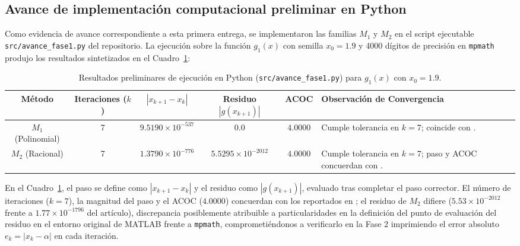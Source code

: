 \documentclass[10pt, a4paper]{article}
\begin{document}
\subsection{Avance de implementación computacional preliminar en Python}
Como evidencia de avance correspondiente a esta primera entrega, se implementaron las familias $M_1$ y $M_2$ en el script ejecutable \texttt{src/avance\_fase1.py} del repositorio. La ejecución sobre la función $g_1(x)$ con semilla $x_0 = 1.9$ y 4000 dígitos de precisión en \texttt{mpmath} produjo los resultados sintetizados en el Cuadro~\ref{tab:avance}:

\begin{table}[htbp]
    \centering
    \small
    \caption{Resultados preliminares de ejecución en Python (\texttt{src/avance\_fase1.py}) para $g_1(x)$ con $x_0 = 1.9$.}
    \label{tab:avance}
    \begin{tabularx}{\textwidth}{c c c c c X}
        \toprule
        \textbf{Método} & \textbf{Iteraciones ($k$)} & \textbf{$|x_{k+1}-x_k|$} & \textbf{Residuo $|g(x_{k+1})|$} & \textbf{ACOC} & \textbf{Observación de Convergencia} \\
        \midrule
        $M_1$ (Polinomial) & 7 & $9.5190 \times 10^{-537}$ & $0.0$ & $4.0000$ & Cumple tolerancia en $k=7$; coincide con \cite{Jerezano2026}. \\
        $M_2$ (Racional) & 7 & $1.3790 \times 10^{-776}$ & $5.5295 \times 10^{-2012}$ & $4.0000$ & Cumple tolerancia en $k=7$; paso y ACOC concuerdan con \cite{Jerezano2026}. \\
        \bottomrule
    \end{tabularx}
\end{table}

En el Cuadro~\ref{tab:avance}, el paso se define como $|x_{k+1}-x_k|$ y el residuo como $|g(x_{k+1})|$, evaluado tras completar el paso corrector. El número de iteraciones ($k=7$), la magnitud del paso y el ACOC ($4.0000$) concuerdan con los reportados en \cite{Jerezano2026}; el residuo de $M_2$ difiere ($5.53 \times 10^{-2012}$ frente a $1.77 \times 10^{-1796}$ del artículo), discrepancia posiblemente atribuible a particularidades en la definición del punto de evaluación del residuo en el entorno original de MATLAB frente a \texttt{mpmath}, comprometiéndonos a verificarlo en la Fase 2 imprimiendo el error absoluto $e_k = |x_k - \alpha|$ en cada iteración.

\end{document}

